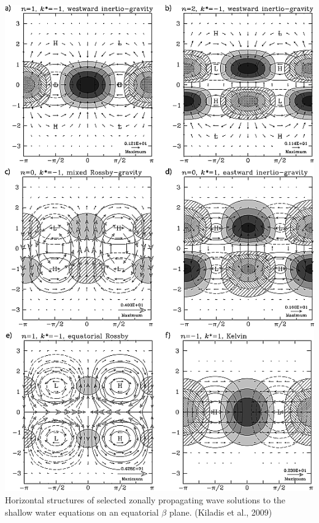 \begin{solution}
\includegraphics[height=0.7\textheight]{graphics/rog1687-fig-0003.png}\\
Horizontal structures of selected zonally propagating wave solutions to the shallow water equations on an equatorial $\beta$ plane. (Kiladis et al., 2009)
\end{solution}

